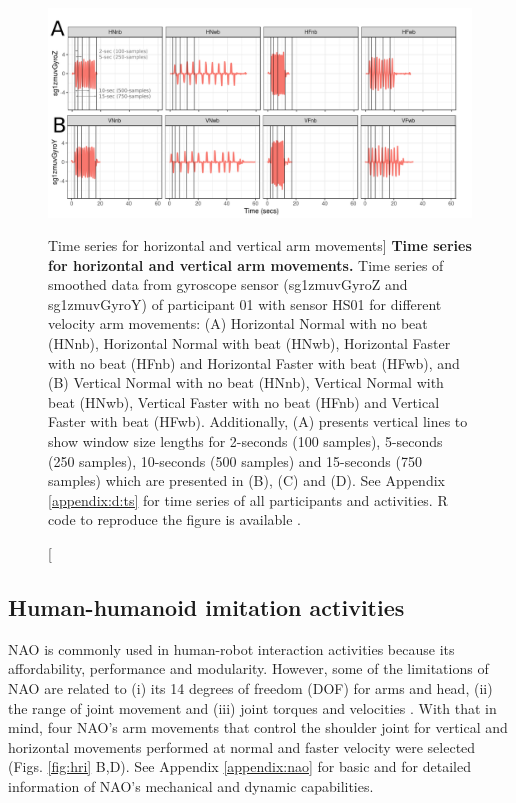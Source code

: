 \begin{figure}
  \centering
  \includegraphics[width=1.0\textwidth]{fig_4_02}
    \caption
	[Time series for horizontal and vertical arm movements]{
	{\bf Time series for horizontal and vertical arm movements.} 
		Time series of smoothed data from gyroscope sensor 
		(sg1zmuvGyroZ and sg1zmuvGyroY) of participant 01 
		with sensor HS01 for different velocity arm movements: 
		(A) Horizontal Normal with no beat (HNnb),
			Horizontal Normal with beat (HNwb), 
			Horizontal Faster with no beat (HFnb) and
			Horizontal Faster with beat (HFwb), and 
		(B) Vertical Normal with no beat (HNnb),
			Vertical Normal with beat (HNwb), 
			Vertical Faster with no beat (HFnb) and
			Vertical Faster with beat (HFwb).
		Additionally, (A) presents vertical lines 
		to show window size lengths for 2-seconds 
		(100 samples), 5-seconds (250 samples), 
		10-seconds (500 samples) and 15-seconds (750 samples)
		which are presented in (B), (C) and (D).
	See Appendix \ref{appendix:d:ts} for 
	time series of all participants and activities. 
		R code to reproduce the figure is available \cite{hwum2018}.
        }
	\label{fig:hii-sts}
\end{figure}

\subsection{Human-humanoid imitation activities} \label{sec:experiment:hhi}
NAO is commonly used in human-robot interaction activities because 
its affordability, performance and modularity.
However, some of the limitations of NAO are related to 
(i) its 14 degrees of freedom (DOF) for arms and head,
(ii) the range of joint movement and 
(iii) joint torques and velocities \citep{gouaillier2009}. 
With that in mind, four NAO's arm movements 
that control the shoulder joint for vertical and horizontal
movements performed at normal and faster velocity 
were selected (Figs. \ref{fig:hri} B,D).
See Appendix \ref{appendix:nao} for basic and \cite{gouaillier2009}
for detailed information of NAO's mechanical and dynamic capabilities. 

